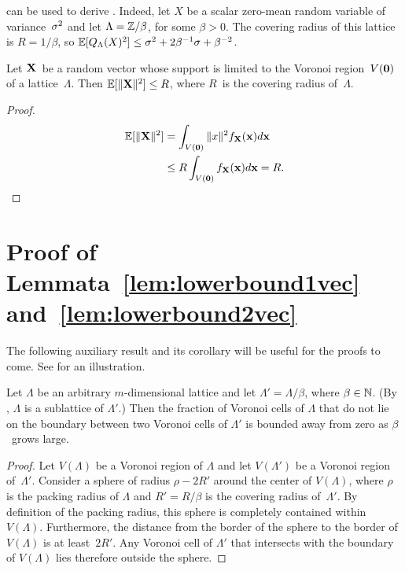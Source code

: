 \begin{subappendices}
  \begin{example}
     can be used to derive . Indeed,
    let $X$ be a scalar zero-mean random variable of variance~${\sigma^2}$ and let
    $\Lambda = \mathbb{Z} / \beta$, for some $\beta > 0$. The covering radius of this
    lattice is $R = 1/\beta$, so $\mathbb{E}[{Q_{\Lambda}}(X)^2] \le {\sigma^2} + 2 \beta^{-1} \sigma +
    \beta^{-2}$. 
  \end{example}

  \begin{lemma}
    \label{lem:voronoivarbound}
    Let $\mathbf{X}$~be a random vector whose support is limited to the Voronoi
    region~$V(\mathbf{0})$ of a lattice~$\Lambda$. Then $\mathbb{E}[\|\mathbf{X}\|^2] \le R$, where
    $R$~is the covering radius of~$\Lambda$.
  \end{lemma}

  \begin{proof}
    \begin{align*}
      \mathbb{E}[\|\mathbf{X}\|^2] & = \int_{V(\mathbf{0})} \|x\|^2 f_{\mathbf{X}}(\mathbf{x}) d\mathbf{x} \\
      & \le R \int_{V(\mathbf{0})} f_{\mathbf{X}}(\mathbf{x}) d\mathbf{x} = R.
    \end{align*}
  \end{proof}




  \section{Proof of Lemmata~\ref{lem:lowerbound1vec}
  and~\ref{lem:lowerbound2vec}}\label{app:lbvecproofs}

  The following auxiliary result and its corollary will be useful for the proofs
  to come. See  for an illustration.

  \begin{lemma}
    \label{lem:subvoronoi}
    Let $\Lambda$ be an arbitrary $m$-dimensional lattice and let $\Lambda' =
    \Lambda/\beta$, where $\beta \in {\mathbb{N}}$. (By ,
    $\Lambda$ is a sublattice of $\Lambda'$.) Then the fraction of Voronoi cells
    of $\Lambda$ that do not lie on the boundary between two Voronoi cells of
    $\Lambda'$ is bounded away from zero as $\beta$~grows large.
  \end{lemma}

  \begin{proof}
    Let $V(\Lambda)$ be a Voronoi region of $\Lambda$ and let $V(\Lambda')$ be a
    Voronoi region of~$\Lambda'$.  Consider a sphere of radius $\rho - 2R'$
    around the center of $V(\Lambda)$, where $\rho$ is the
    packing radius of $\Lambda$ and $R' = R/\beta$ is
    the covering radius of~$\Lambda'$. By definition of the packing radius, this
    sphere is completely contained within $V(\Lambda)$. Furthermore, the
    distance from the border of the sphere to the border of $V(\Lambda)$ is
    at least~$2R'$. Any Voronoi cell of $\Lambda'$ that intersects
    with the boundary of $V(\Lambda)$ lies therefore outside the sphere. 
    

\end{proof}
\end{subappendices}
